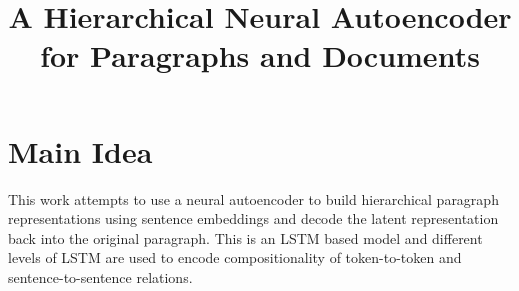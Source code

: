 \documentclass[12pt]{scrartcl}
\begin{document}
\title{A Hierarchical Neural Autoencoder for Paragraphs and Documents}
\author{}
\date{}
\maketitle

\section{Main Idea}
  This work attempts to use a neural autoencoder to build hierarchical paragraph representations using sentence embeddings and decode the latent representation back into the original paragraph. This is an LSTM based model and different levels of LSTM are used to encode compositionality of token-to-token and sentence-to-sentence relations. \cite{li2015hierarchical}
\end{document}
